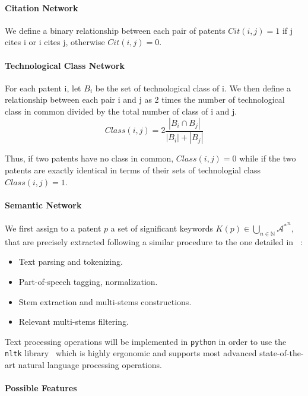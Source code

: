 \paragraph{Citation Network}

We define a binary relationship between each pair of patents $Cit(i, j) = 1$ if j cites i or i cites j, otherwise $Cit(i, j) = 0$. 

\paragraph{Technological Class Network}

For each patent i, let $B_i$ be the set of technological class of i. We then define a relationship between each pair i and j as 2 times the number of technological class in common divided by the total number of class of i and j. 
\[
Class(i,j) = 2\frac{\left\vert{B_i\cap B_j}\right\vert}{\left\vert{B_i}\right\vert+\left\vert{B_j}\right\vert}
\]

Thus, if two patents have no class in common, $Class(i,j)=0$ while if the two patents are exactly identical in terms of their sets of technologial class $Class(i,j)=1$.

\paragraph{Semantic Network}

We first assign to a patent $p$ a set of significant keywords $K(p)\in \bigcup_{n\in \mathbb{N}} {\mathcal{A}^{\ast}}^n$, that are precisely extracted following a similar procedure to the one detailed in~\cite{chavalarias2013phylomemetic} :
\begin{itemize}
\item Text parsing and tokenizing.
\item Part-of-speech tagging, normalization.
\item Stem extraction and multi-stems constructions.
\item Relevant multi-stems filtering.
\end{itemize}

Text processing operations will be implemented in \texttt{python} in order to use the \texttt{nltk} library~\cite{} %
which is highly ergonomic and supports most advanced state-of-the-art natural language processing operations.


\paragraph{Possible Features}





